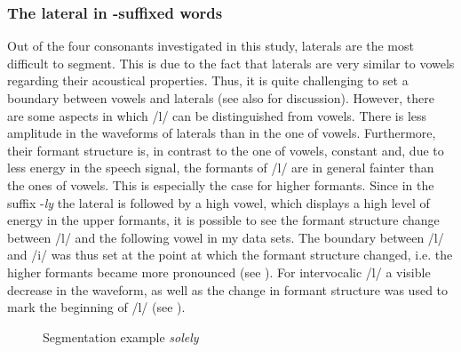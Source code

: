 \subsubsection{The lateral in -suffixed words} \label{ly-segmentation}

Out of the four consonants investigated in this study, laterals are the most difficult to segment. This is due to the fact that laterals are very similar to vowels regarding their acoustical properties. Thus, it is quite challenging to set a boundary between vowels and laterals (see also \citealt[Chapter 7]{Machac.2009} for discussion). However, there are some aspects in which /l/ can be distinguished from vowels. There is less amplitude in the waveforms of laterals than in the one of vowels.  Furthermore, their formant structure is, in contrast to the one of vowels, constant and, due to less energy in the speech signal, the formants of /l/ are in general fainter than the ones of vowels. This is especially the case for higher formants. Since in the suffix -\textit{ly} the lateral is followed by a high vowel, which displays a high level of energy in the upper formants, it is possible to see the formant structure change between /l/ and the following vowel in my data sets. The boundary between /l/ and /i/ was thus set at the point at which the formant structure changed, i.e. the higher formants became more pronounced (see ). For intervocalic /l/ a visible decrease in the waveform, as well as the change in formant structure was used to mark the beginning of /l/ (see ).
 
\begin{figure}  
	
	\caption{Segmentation example \textit{solely}}
	\label{fig:segmentation solely}
\end{figure}


